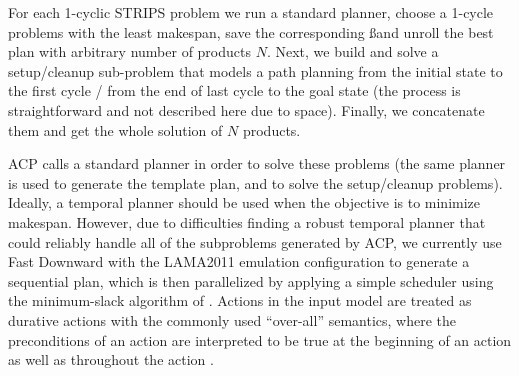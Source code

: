 
For each 1-cyclic STRIPS problem we run a standard \domind planner,
 choose a 1-cycle problems with the least makespan,
 save the corresponding \ss and
 unroll the best plan with arbitrary number of products $N$.
Next, we build and solve a setup/cleanup sub-problem 
that models a path planning from the initial state to the first cycle /
 from the end of last cycle to the goal state (the process is straightforward and not described here due to space).
Finally, we concatenate them and get the whole solution of $N$ products.

ACP calls a standard \domind planner in order to solve these problems (the same planner is used to generate the template plan, and to solve the setup/cleanup problems).
Ideally,
a temporal planner should be used when the objective is to minimize
makespan. However, due to difficulties finding a robust temporal
planner that could reliably handle all of the subproblems generated by
ACP, we currently use Fast Downward \cite{Helmert2006} with the LAMA2011 emulation configuration to generate a sequential plan, which is
then parallelized by applying a simple scheduler using the
minimum-slack algorithm of \cite{Smith1993}. 
Actions in the input  model are treated as durative actions with the commonly used ``over-all'' semantics, where the preconditions of an action are interpreted to be true at the beginning of an action as well as throughout the action \cite{CushingKTWM2007}.


